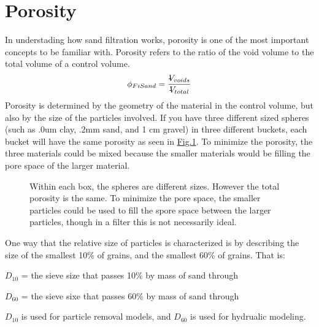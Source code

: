 \documentclass[letterpaper,10pt,english]{sphinxmanual}
\begin{document}
\section{Porosity}
\label{\detokenize{Filtration/Filtration_Design:porosity}}\label{\detokenize{Filtration/Filtration_Design:heading-porosity}}
In understading how sand filtration works, porosity is one of the most important concepts to be familiar with. Porosity refers to the ratio of the void volume to the total volume of a control volume.
\begin{equation}\label{equation:Filtration/Filtration_Design:porosity}
\begin{split} \phi_{FiSand} = \frac{\rlap{-} V_{voids}}{\rlap{-} V_{total}}\end{split}
\end{equation}
Porosity is determined by the geometry of the material in the control volume, but also by the size of the particles involved. If you have three different sized spheres (such as .0um clay, .2mm sand, and 1 cm gravel) in three different buckets, each bucket will have the same porosity as seen in \hyperref[\detokenize{Filtration/Filtration_Design:figure-porosity}]{Fig.\@ \ref{\detokenize{Filtration/Filtration_Design:figure-porosity}}}. To minimize the porosity, the three materials could be mixed because the smaller materials would be filling the pore space of the larger material.

\begin{figure}[htbp]
\centering
\capstart

\noindent{}
\caption{Within each box, the spheres are different sizes. However the total porosity is the same. To minimize the pore space, the smaller particles could be used to fill the spore space between the larger particles, though in a filter this is not necessarily ideal.}\label{\detokenize{Filtration/Filtration_Design:id2}}\label{\detokenize{Filtration/Filtration_Design:figure-porosity}}\end{figure}

One way that the relative size of particles is characterized is by describing the size of the smallest 10\% of grains, and the smallest 60\% of grains. That is:

\(D_{10}\) = the sieve size that passes 10\% by mass of sand through

\(D_{60}\) = the sieve sixe that passes 60\% by mass of sand through

\(D_{10}\) is used for particle removal models, and \(D_{60}\) is used for hydrualic modeling.
\end{document}
